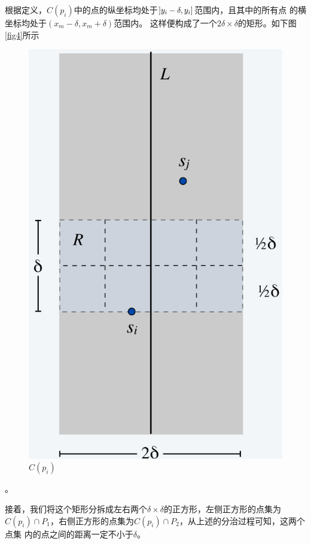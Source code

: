 根据定义，$C(p_i)$中的点的纵坐标均处于$\interval[open left]{y_i - \delta}{y_i}$范围内，且其中的所有点
的横坐标均处于$\left( x_m - \delta, x_m + \delta \right)$范围内。
这样便构成了一个$2\delta\times\delta$的矩形。如下图\autoref{fig4}所示
\begin{figure}[htb]
    \centering
    \includegraphics[scale=0.5]{image/NearestPointsCpi.png}
    \caption{$C(p_i)$}\label{fig4}
\end{figure}。

接着，我们将这个矩形分拆成左右两个$\delta \times \delta$的正方形，左侧正方形的点集为
$C(p_i)\cap P_1$，右侧正方形的点集为$C(p_i)\cap P_2$，从上述的分治过程可知，这两个点集
内的点之间的距离一定不小于$\delta$。

